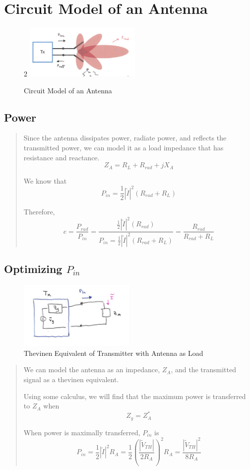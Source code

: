 \documentclass{article} %
\begin{document}
\section{Circuit Model of an Antenna}
\begin{figure}[H]2
    \centering
    \includegraphics[width=0.5\textwidth]{./image/figure9.png}
    \caption{Circuit Model of an Antenna}
\end{figure}
\subsection{Power}
\begin{quote}
    Since the antenna dissipates power, radiate power, and reflects the transmitted power, we can model it as a load impedance that has resistance and reactance.
    \[Z_A = R_L + R_{rad} + j X_A\]

    We know that
    \[P_{in} = \frac{1}{2}|\tilde{I}|^2 (R_{rad} + R_L)\]

    Therefore,
    \[e = \frac{P_{rad}}{P_{in}} = \frac{\frac{1}{2}|\tilde{I}|^2 (R_{rad})}{P_{in} = \frac{1}{2}|\tilde{I}|^2 (R_{rad} + R_L)} = \frac{R_{rad}}{R_{rad} + R_L}\]
\end{quote}

\subsection{Optimizing $P_{in}$}

\begin{figure}[H]
    \centering
    \includegraphics[width=0.5\textwidth]{./image/figure5.png}
    \caption{Thevinen Equivalent of Transmitter with Antenna as Load}
\end{figure}
\begin{quote}
    We can model the antenna as an impedance, $Z_A$, and the transmitted signal as a thevinen equivalent.

    Using some calculus, we will find that the maximum power is transferred to $Z_A$ when
    \[Z_g = Z_A^*\]

    When power is maximally transferred, $P_{in}$ is
    \[P_{in} = \frac{1}{2}|\tilde{I}|^2 R_A = \frac{1}{2}\left(\frac{|\tilde{V}_{TH}|}{2R_A}\right)^2R_A = \frac{|\tilde{V}_{TH}|^2}{8R_A}\]
\end{quote}
\end{document}
